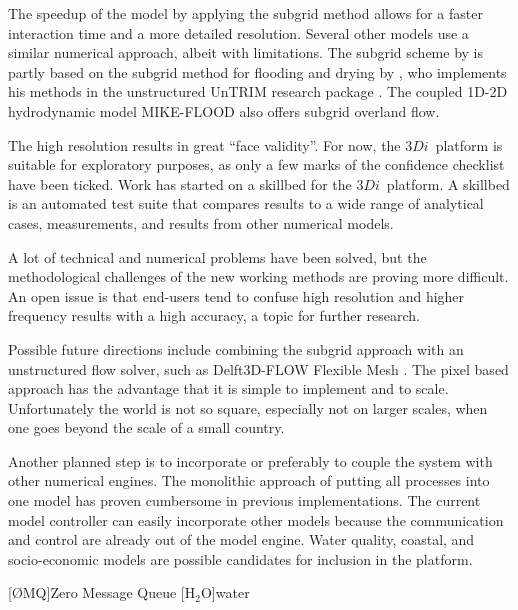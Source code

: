 \documentclass[a4paper]{article}
\DeclareRobustCommand{\threedi}{$3Di$~}
\begin{document}
The speedup of the model by applying the subgrid method allows for a faster interaction time and a more detailed resolution.
Several other models use a similar numerical approach, albeit with limitations. The subgrid scheme by \citet{Stelling2012} is partly based on the subgrid method for flooding and drying by \citet{Casulli2009}, who implements his methods in the unstructured UnTRIM research package \citet{Casulli2000}. The coupled 1D-2D hydrodynamic model MIKE-FLOOD \citep{Dhi2014} also offers subgrid overland flow.

The high resolution results in great ``face validity''. For now, the \threedi platform is suitable for exploratory purposes, as only a few marks of the confidence checklist \citep[][pp. 136]{Baart2013} have been ticked. Work has started on a skillbed for the \threedi platform. A skillbed is an automated test suite that compares results to a wide range of analytical cases, measurements, and results from other numerical models.

A lot of technical and numerical problems have been solved, but the methodological challenges of the new working methods are proving more difficult. An open issue is that end-users tend to confuse high resolution and higher frequency results with a high accuracy, a topic for further research.

Possible future directions include combining the subgrid approach with an unstructured flow solver, such as Delft3D-FLOW Flexible Mesh \citep{Kernkamp2011}. The pixel based approach has the advantage that it is simple to implement and to scale. Unfortunately the world is not so square, especially not on larger scales, when one goes beyond the scale of a small country.

Another planned step is to incorporate or preferably to couple the system with other numerical engines. The monolithic approach of putting all processes into one model has proven cumbersome in previous implementations. The current model controller can easily incorporate other models because the communication and control are already out of the model engine. Water quality, coastal, and socio-economic models are possible candidates for inclusion in the platform.




\begin{acronym}[AAAAA]
  [\O{}MQ]{Zero Message Queue}
  [$\mathrm{H_2O}$]{water}
\end{acronym}
\end{document}
